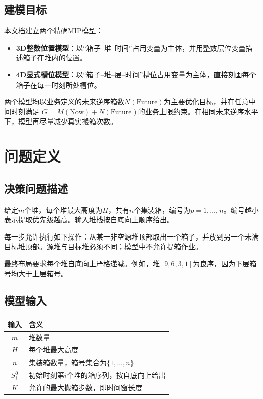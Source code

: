 \documentclass[11pt,a4paper]{ctexart}
\newcommand{\highlight}[1]{\textbf{\color{mainblue}#1}}
\begin{document}
\subsection{建模目标}
本文档建立两个精确MIP模型：
\begin{itemize}
    \item \highlight{3D整数位置模型}：以“箱子--堆--时间”占用变量为主体，并用整数层位变量描述箱子在堆内的位置。
    \item \highlight{4D显式槽位模型}：以“箱子--堆--层--时间”槽位占用变量为主体，直接刻画每个箱子在每一时刻所处槽位。
\end{itemize}

两个模型均以业务定义的未来逆序箱数$N(\mathrm{Future})$为主要优化目标，并在任意中间时刻满足
$G=M(\mathrm{Now})+N(\mathrm{Future})$的业务上限约束。在相同未来逆序水平下，模型再尽量减少真实搬箱次数。

\section{问题定义}

\subsection{决策问题描述}
给定$m$个堆，每个堆最大高度为$H$，共有$n$个集装箱，编号为$p=1,\ldots,n$。编号越小表示提取优先级越高。输入堆栈按自底向上顺序给出。

每一步允许执行如下操作：从某一非空源堆顶部取出一个箱子，并放到另一个未满目标堆顶部。源堆与目标堆必须不同；模型中不允许提箱作业。

最终布局要求每个堆自底向上严格递减。例如，堆$[9,6,3,1]$为良序，因为下层箱号均大于上层箱号。

\subsection{模型输入}
\begin{table}[H]
\centering
\renewcommand{\arraystretch}{1.35}
\begin{tabularx}{0.92\textwidth}{>{\bfseries}c >{\raggedright\arraybackslash}X}
\toprule
输入 & 含义 \\
\midrule
$m$ & 堆数量 \\
$H$ & 每个堆最大高度 \\
$n$ & 集装箱数量，箱号集合为$\{1,\ldots,n\}$ \\
$S_i^0$ & 初始时刻第$i$个堆的箱序列，按自底向上给出 \\
$K$ & 允许的最大搬箱步数，即时间窗长度 \\
\bottomrule
\end{tabularx}
\end{table}
\end{document}

